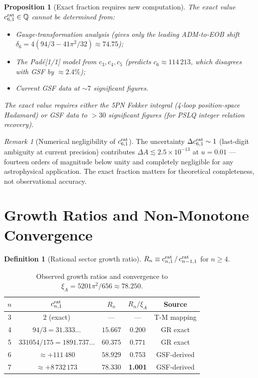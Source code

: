 \documentclass[11pt,a4paper]{article}
\theoremstyle{plain}
\newtheorem{proposition}[theorem]{Proposition}
\theoremstyle{definition}
\newtheorem{definition}[theorem]{Definition}
\theoremstyle{remark}
\newtheorem{remark}[theorem]{Remark}
\newcommand{\xiA}{\xi_A}
\begin{document}
\begin{proposition}[Exact fraction requires new computation]\label{prop:need_fokker}
The exact value $c_{6,1}^{\rm rat}\in\mathbb{Q}$ cannot be determined from:
\begin{itemize}[noitemsep]
  \item Gauge-transformation analysis (gives only the leading ADM-to-EOB shift
    $\delta_6 = 4(94/3 - 41\pi^2/32) \approx 74.75$);
  \item The Pad\'e[1/1] model from $c_3,c_4,c_5$ (predicts $c_6 \approx 114\,213$,
    which disagrees with GSF by $\approx 2.4\%$);
  \item Current GSF data at $\sim 7$ significant figures.
\end{itemize}
The exact value requires either the 5PN Fokker integral (4-loop position-space
Hadamard) or GSF data to $>30$ significant figures (for PSLQ integer relation recovery).
\end{proposition}

\begin{remark}[Numerical negligibility of $c_{6,1}^{\rm rat}$]
The uncertainty $\Delta c_{6,1}^{\rm rat} \sim 1$ (last-digit ambiguity at current
precision) contributes $\Delta A \lesssim 2.5\times10^{-13}$ at $u=0.01$ ---
fourteen orders of magnitude below unity and completely negligible for any
astrophysical application.  The exact fraction matters for theoretical completeness,
not observational accuracy.
\end{remark}

\section{Growth Ratios and Non-Monotone Convergence}
\label{sec:growth}

\begin{definition}[Rational sector growth ratio]
$R_n \equiv c_{n,1}^{\rm rat}\,/\,c_{n-1,1}^{\rm rat}$ for $n\geq4$.
\end{definition}

\begin{table}[h]
\centering\small\renewcommand{\arraystretch}{1.3}
\caption{Observed growth ratios and convergence to $\xiA = 5201\pi^2/656 \approx 78.250$.}
\label{tab:growth}
\begin{tabular}{@{}ccccc@{}}
\toprule
$n$ & $c_{n,1}^{\rm rat}$ & $R_n$ & $R_n/\xiA$ & Source \\
\midrule
3 & $2$ (exact) & --- & --- & T-M mapping \\
4 & $94/3 = 31.333\ldots$ & $15.667$ & $0.200$ & GR exact \\
5 & $331054/175 = 1891.737\ldots$ & $60.375$ & $0.771$ & GR exact \\
6 & $\approx +111\,480$ & $58.929$ & $0.753$ & GSF-derived \\
7 & $\approx +8\,732\,173$ & $78.330$ & \textbf{1.001} & GSF-derived \\
\bottomrule
\end{tabular}
\end{table}
\end{document}
